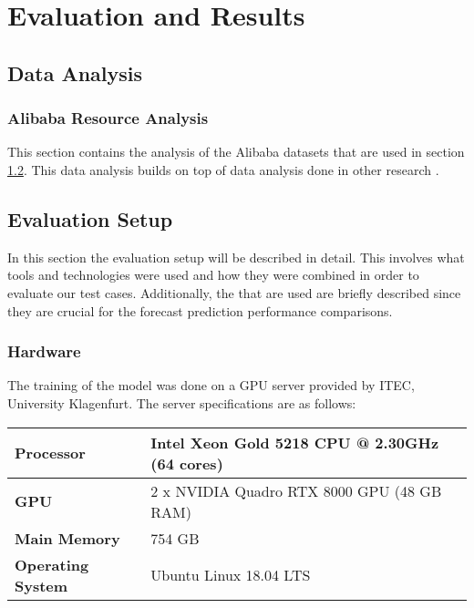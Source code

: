 \chapter{Evaluation and Results}
\label{ch:evaluation-and-results}

\section{Data Analysis}
\label{sec:data-analysis-evaluation}

  \subsection{Alibaba Resource Analysis}
  \label{sec:alibaba-resource-analysis-data-analysis}

    This section contains the analysis of the Alibaba datasets that are used in section \ref{sec:evaluation-setup}. This data analysis builds on top of data analysis done in other research \cite{fengcunDeepJSJobScheduling2023}.

\section{Evaluation Setup}
\label{sec:evaluation-setup}

  In this section the evaluation setup will be described in detail. 
  This involves what tools and technologies were used and how they were combined in order to evaluate our test cases. Additionally, the  that are used are briefly described since they are crucial for the forecast prediction performance comparisons.
  
  \subsection{Hardware}
  \label{sec:hardware}

    The training of the  model was done on a GPU server provided by ITEC, University Klagenfurt. The server specifications are as follows:

    \begin{center}
      \begin{tabular}{| l | l |}
        \hline
        \textbf{Processor}   &   Intel Xeon Gold 5218 CPU @ 2.30GHz (64 cores) \\ \hline
        \textbf{GPU}         &   2 x NVIDIA Quadro RTX 8000 GPU (48 GB RAM)    \\ \hline
        \textbf{Main Memory} &   754 GB                                        \\ \hline
        \textbf{Operating System} &  Ubuntu Linux 18.04 LTS                    \\ \hline

        \hline
      \end{tabular}
      \end{center}




